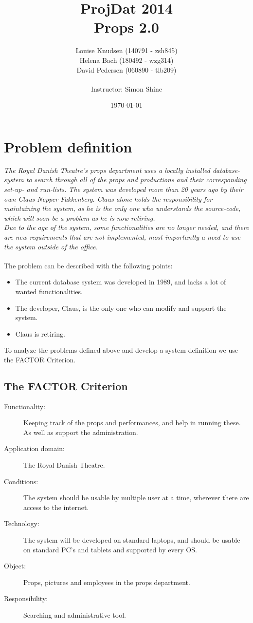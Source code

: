 \documentclass[12pt]{article}
\title{ProjDat 2014\\Props 2.0}
\author{Louise Knudsen (140791 - zsh845)\\
Helena Bach (180492 - wzg314)\\
David Pedersen (060890 - tlb209)\\\\
Instructor: Simon Shine }
\date{\today}
\begin{document}
\maketitle
\newpage
\section{Problem definition}
\textit{The Royal Danish Theatre's props department uses a locally installed database-system to search through all of the props and productions and their corresponding set-up- and run-lists. The system was developed more than 20 years ago by their own Claus Nepper Fakkenberg. Claus alone holds the responsibility for maintaining the system, as he is the only one who understands the source-code, which will soon be a problem as he is now retiring. \\
Due to the age of the system, some functionalities are no longer needed, and there are new requirements that are not implemented, most importantly a need to use the system outside of the office.} \\\\
The problem can be described with the following points:
\begin{itemize}
  \item The current database system was developed in 1989, and lacks a lot of wanted functionalities.
  \item The developer, Claus, is the only one who can modify and support the system.
  \item Claus is retiring.
\end{itemize}
To analyze the problems defined above and develop a system definition we use the FACTOR Criterion.
\subsection{The FACTOR Criterion}
\begin{description}
  \item[Functionality:] Keeping track of the props and performances, and help in running these. As well as support the administration.
  \item[Application domain:] The Royal Danish Theatre.
  \item[Conditions:] The system should be usable by multiple user at a time, wherever there are access to the internet.
  \item[Technology:] The system will be developed on standard laptops, and should be usable on standard PC's and tablets and supported by every OS.
  \item[Object:] Props, pictures and employees in the props department.
  \item[Responsibility:] Searching and administrative tool.
\end{description}
\end{document}
